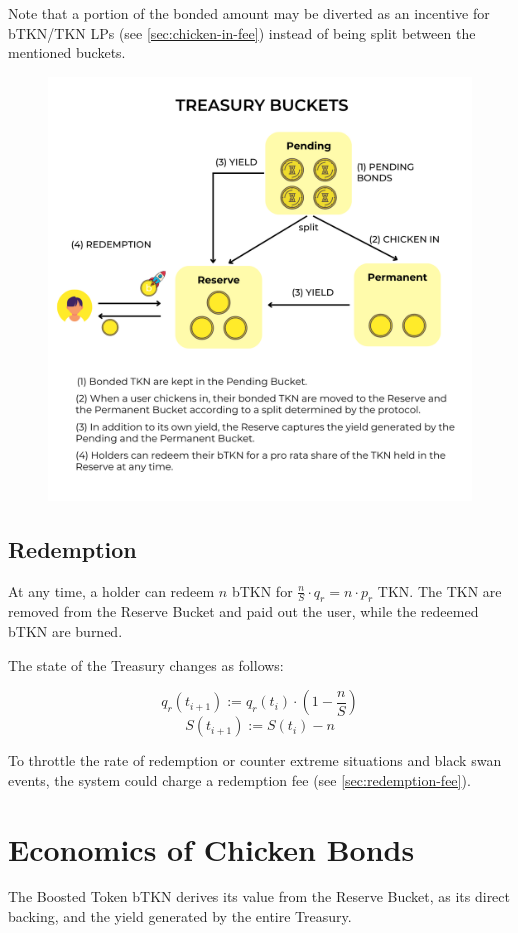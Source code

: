 \documentclass{article}
\begin{document}
Note that a portion of the bonded amount may be diverted as an incentive for bTKN/TKN LPs (see \ref{sec:chicken-in-fee}) instead of being split between the mentioned buckets.

\begin{figure}[ht]
    \centering
    \includegraphics[width=0.5\linewidth]{./treasury_text.png}
\end{figure}

\subsection{Redemption}
\label{sec:redemption}
At any time, a holder can redeem $n$ bTKN for $\frac{n}{S}\cdot q_r = n \cdot p_r$ TKN.
The TKN are removed from the Reserve Bucket and paid out the user, while the redeemed bTKN are burned.

The state of the Treasury changes as follows: 

\begin{equation}
  \label{eq:redemption-qa}
    q_r(t_{i+1}) := q_r(t_i) \cdot (1 - \frac{n}{S})
\end{equation}
\begin{equation}
  \label{eq:redemption-S}
    S(t_{i+1}) := S(t_i) - n
\end{equation}

To throttle the rate of redemption or counter extreme situations and black swan events, the system could charge a redemption fee (see \ref{sec:redemption-fee}).

\section{Economics of Chicken Bonds}
 \label{sec:economics}
The Boosted Token bTKN derives its value from the Reserve Bucket, as its direct backing, and the yield generated by the entire Treasury.
\end{document}
